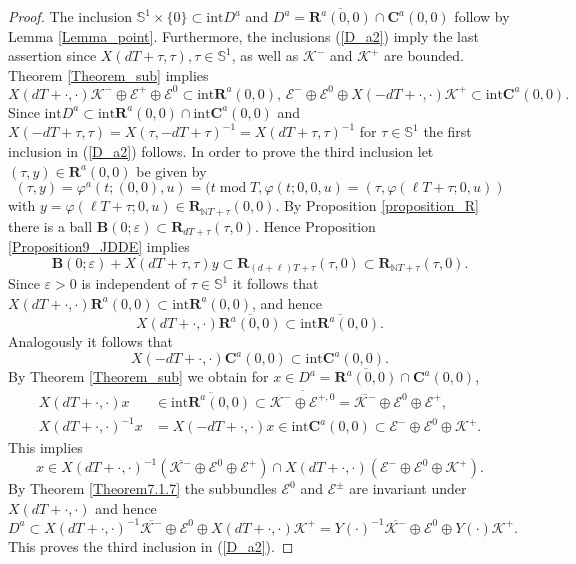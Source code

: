 \documentclass[10pt,a4paper]{amsart}
\begin{document}
\begin{proof}
The inclusion $\mathbb{S}^{1}\times\{0\}\subset\mathrm{int}D^{a}$ and
$D^{a}=\overline{\mathbf{R}^{a}(0,0)}\cap\mathbf{C}^{a}(0,0)$ follow by Lemma
\ref{Lemma_point}. Furthermore, the inclusions (\ref{D_a2}) imply the last
assertion since $X(dT+\tau,\tau),\tau\in\mathbb{S}^{1}$, as well as
$\mathcal{K}^{-}$ and $\mathcal{K}^{+}$ are bounded. Theorem \ref{Theorem_sub}
implies%
\[
X(dT+\cdot,\cdot)\mathcal{K}^{-}\oplus\mathcal{E}^{+}\oplus\mathcal{E}%
^{0}\subset\mathrm{int}\mathbf{R}^{a}(0,0),\,\mathcal{E}^{-}\oplus
\mathcal{E}^{0}\oplus X(-dT+\cdot,\cdot)\mathcal{K}^{+}\subset\mathrm{int}%
\mathbf{C}^{a}(0,0).
\]
Since $\mathrm{int}D^{a}\subset\mathrm{int}\mathbf{R}^{a}(0,0)\cap
\mathrm{int}\mathbf{C}^{a}(0,0)$ and $X(-dT+\tau,\tau)=X(\tau,-dT+\tau
)^{-1}=X(dT+\tau,\tau)^{-1}$ for $\tau\in\mathbb{S}^{1}$ the first inclusion
in (\ref{D_a2}) follows. In order to prove the third inclusion let
$(\tau,y)\in\mathbf{R}^{a}(0,0)$ be given by%
\[
(\tau,y)=\varphi^{a}(t;(0,0),u)=(t\operatorname{mod}T,\varphi(t;0,0,u)=(\tau
,\varphi(\ell T+\tau;0,u))
\]
with $y=\varphi(\ell T+\tau;0,u)\in\mathbf{R}_{\mathbb{N}T+\tau}(0,0)$. By
Proposition \ref{proposition_R} there is a ball $\mathbf{B}(0;\varepsilon
)\subset\mathbf{R}_{dT+\tau}(\tau,0)$. Hence Proposition
\ref{Proposition9_JDDE} implies%
\[
\mathbf{B}(0;\varepsilon)+X(dT+\tau,\tau)y\subset\mathbf{R}_{(d+\ell)T+\tau
}(\tau,0)\subset\mathbf{R}_{\mathbb{N}T+\tau}(\tau,0).
\]
Since $\varepsilon>0$ is independent of $\tau\in\mathbb{S}^{1}$ it follows
that $X(dT+\cdot,\cdot)\mathbf{R}^{a}(0,0)\subset\mathrm{int}\mathbf{R}%
^{a}(0,0)$, and hence%
\[
X(dT+\cdot,\cdot)\overline{\mathbf{R}^{a}(0,0)}\subset\overline{\mathrm{int}%
\mathbf{R}^{a}(0,0)}.
\]
Analogously it follows that%
\[
X(-dT+\cdot,\cdot)\mathbf{C}^{a}(0,0)\subset\mathrm{int}\mathbf{C}^{a}(0,0).
\]
By Theorem \ref{Theorem_sub} we obtain for $x\in D^{a}=\overline
{\mathbf{R}^{a}(0,0)}\cap\mathbf{C}^{a}(0,0)$,%
\begin{align*}
X(dT+\cdot,\cdot)x  &  \in\overline{\mathrm{int}\mathbf{R}^{a}(0,0)}%
\subset\overline{\mathcal{K}^{-}\oplus\mathcal{E}^{+,0}}=\overline
{\mathcal{K}^{-}}\oplus\mathcal{E}^{0}\oplus\mathcal{E}^{+},\\
X(dT+\cdot,\cdot)^{-1}x  &  =X(-dT+\cdot,\cdot)x\in\mathrm{int}\mathbf{C}%
^{a}(0,0)\subset\mathcal{E}^{-}\oplus\mathcal{E}^{0}\oplus\mathcal{K}^{+}.
\end{align*}
This implies%
\[
x\in X(dT+\cdot,\cdot)^{-1}\left(  \overline{\mathcal{K}^{-}}\oplus
\mathcal{E}^{0}\oplus\mathcal{E}^{+}\right)  \cap X(dT+\cdot,\cdot)\left(
\mathcal{E}^{-}\oplus\mathcal{E}^{0}\oplus\mathcal{K}^{+}\right)  .
\]
By Theorem \ref{Theorem7.1.7} the subbundles $\mathcal{E}^{0}$ and
$\mathcal{E}^{\pm}$ are invariant under $X(dT+\cdot,\cdot)$ and hence%
\[
D^{a}\subset X(dT+\cdot,\cdot)^{-1}\overline{\mathcal{K}^{-}}\oplus
\mathcal{E}^{0}\oplus X(dT+\cdot,\cdot)\mathcal{K}^{+}=Y(\cdot)^{-1}%
\overline{\mathcal{K}^{-}}\oplus\mathcal{E}^{0}\oplus Y(\cdot)\mathcal{K}%
^{+}.
\]
This proves the third inclusion in (\ref{D_a2}).


\end{proof}
\end{document}
